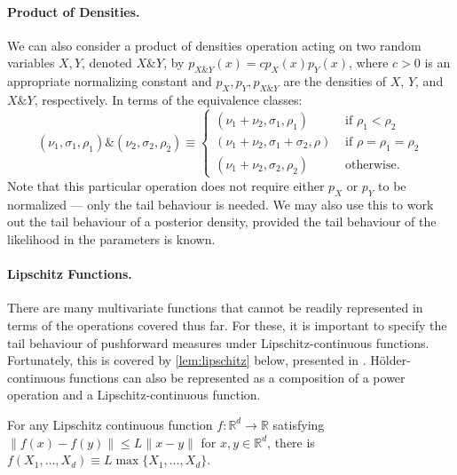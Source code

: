 \documentclass[../thesis.tex]{subfiles}
\begin{document}
\paragraph{Product of Densities.}

We can also consider a product of densities operation acting on two random variables $X,Y$, denoted $X \& Y$, by
$p_{X \& Y}(x) = c p_X(x) p_Y(x)$,
where $c > 0$ is an appropriate normalizing constant and $p_X,p_Y,p_{X\& Y}$ are the densities of $X$, $Y$, and $X \& Y$, respectively. In terms of the equivalence classes:
\[
  (\nu_1,\sigma_1,\rho_1)\&(\nu_2,\sigma_2,\rho_2)
  \equiv \begin{cases}
    (\nu_{1}+\nu_{2},\sigma_{1},\rho_{1})        & \text{ if }\rho_{1}<\rho_{2}      \\
    (\nu_{1}+\nu_{2},\sigma_{1}+\sigma_{2},\rho) & \text{ if }\rho=\rho_{1}=\rho_{2} \\
    (\nu_{1}+\nu_{2},\sigma_{2},\rho_{2})        & \text{ otherwise.}
  \end{cases}
\]
Note that this particular operation does not require either $p_X$ or $p_Y$ to be normalized --- only the tail behaviour is needed. We may also use this to work out the tail behaviour of a posterior density, provided the tail behaviour of the likelihood in the parameters is known.

\paragraph{Lipschitz Functions.}

There are many multivariate functions that cannot be readily represented in terms of the operations covered thus far. For these, it is important to specify the tail behaviour of pushforward measures under Lipschitz-continuous functions. Fortunately, this is covered by \cref{lem:lipschitz} below, presented in \cite[Proposition 1.3]{ledoux2001concentration}.
H\"{o}lder-continuous functions can also be represented as a composition of a power operation and a Lipschitz-continuous function.
\begin{lemma}\label{lem:lipschitz}
  For any Lipschitz continuous function $f:\mathbb{R}^d \to \mathbb{R}$ satisfying $\|f(x)-f(y)\|\leq L\|x -y\|$ for $x,y \in \mathbb{R}^d$, there is $f(X_1,\dots,X_d) \equiv L \max\{X_1,\dots,X_d\}.$
\end{lemma}
\end{document}
